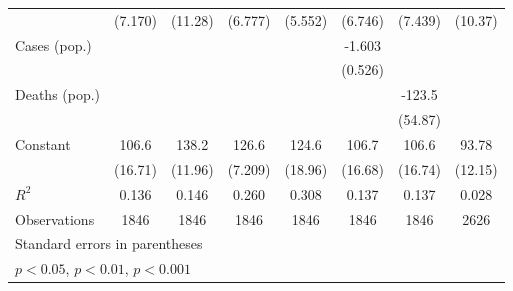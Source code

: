 \documentclass{article}
\begin{document}
{\begin{longtable}{l*{7}{c}}
                &  (7.170)         &  (11.28)         &  (6.777)         &  (5.552)         &  (6.746)         &  (7.439)         &  (10.37)         \\
Cases (pop.)    &                  &                  &                  &                  &   -1.603\sym{*}  &                  &                  \\
                &                  &                  &                  &                  &  (0.526)         &                  &                  \\
Deaths (pop.)   &                  &                  &                  &                  &                  &   -123.5\sym{*}  &                  \\
                &                  &                  &                  &                  &                  &  (54.87)         &                  \\
Constant        &    106.6\sym{***}&    138.2\sym{***}&    126.6\sym{***}&    124.6\sym{***}&    106.7\sym{***}&    106.6\sym{***}&    93.78\sym{***}\\
                &  (16.71)         &  (11.96)         &  (7.209)         &  (18.96)         &  (16.68)         &  (16.74)         &  (12.15)         \\
\hline
\(R^{2}\)       &    0.136         &    0.146         &    0.260         &    0.308         &    0.137         &    0.137         &    0.028         \\
Observations    &     1846         &     1846         &     1846         &     1846         &     1846         &     1846         &     2626         \\
\hline\hline
\multicolumn{8}{l}{\footnotesize Standard errors in parentheses}\\
\multicolumn{8}{l}{\footnotesize \sym{*} \(p<0.05\), \sym{**} \(p<0.01\), \sym{***} \(p<0.001\)}\\
\end{longtable}
}
\end{document}

